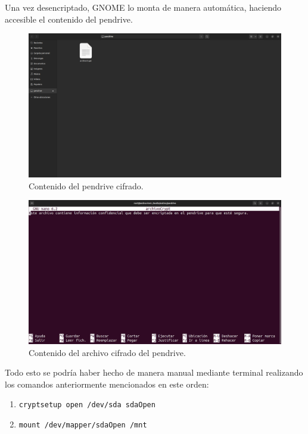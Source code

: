 \documentclass{article}
\begin{document}
\bigskip

Una vez desencriptado, GNOME lo monta de manera automática, haciendo accesible el contenido del pendrive.

\begin{figure}[H]
    \includegraphics[width=\textwidth]{imagenes/Captura desde 2022-10-30 11-05-16.png}
    \caption{Contenido del pendrive cifrado.}
\end{figure}

\begin{figure}[H]
    \includegraphics[width=\textwidth]{imagenes/Captura desde 2022-10-30 11-05-44.png}
    \caption{Contenido del archivo cifrado del pendrive.}
\end{figure}

\bigskip

Todo esto se podría haber hecho de manera manual mediante terminal realizando los comandos anteriormente mencionados en este orden:

\begin{enumerate}
    \item \verb|cryptsetup open /dev/sda sdaOpen|
    \item \verb|mount /dev/mapper/sdaOpen /mnt|
\end{enumerate}
\end{document}

